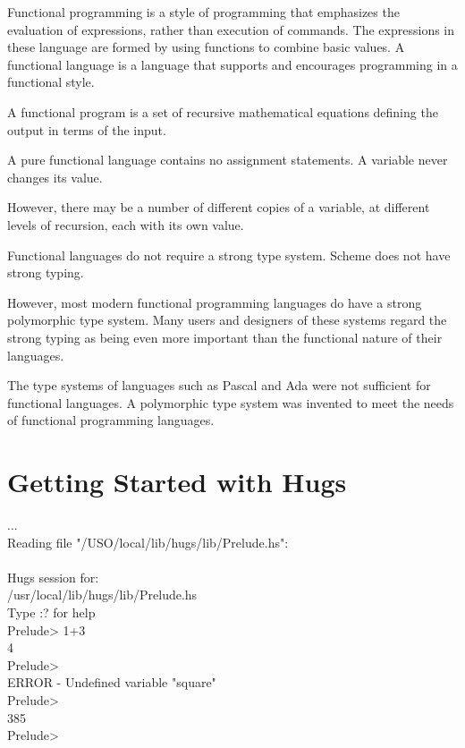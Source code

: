 \documentclass{seminar}
\begin{document}
\begin{slide}
{Functional programming is a style of programming that emphasizes
the evaluation of expressions, rather than execution of commands.
The expressions in these language are formed by using functions to
combine basic values.  A functional language is a language that
supports and encourages programming in a functional style.
}

\newslide

A functional program is a set of recursive mathematical equations
defining the output in terms of the input.

A pure functional language contains no assignment statements.  A
variable never changes its value.

However, there may be a number of different copies of a variable,
at different levels of recursion, each with its own value.

\newslide

Functional languages do not require a strong type system.  Scheme does not
have strong typing.

However, most modern functional programming languages do have a strong
polymorphic type system.  Many users and designers of these systems
regard the strong typing as being even more important than the functional
nature of their languages.

The type systems of languages such as Pascal and Ada were not sufficient
for functional languages.  A polymorphic type system was invented to
meet the needs of functional programming languages.

\newslide

\section*{Getting Started with Hugs}

\begin{code}%
\color{red}
{\LARGE ...}\\
Reading file "/USO/local/lib/hugs/lib/Prelude.hs":\\
                   \\
Hugs session for:\\
/usr/local/lib/hugs/lib/Prelude.hs\\
Type :? for help\\
Prelude> \color{CodeColor}1+3\\
4\\
Prelude>\\
ERROR - Undefined variable "square"\\
Prelude>\\
385\\
Prelude>
\end{code}


\end{slide}
\end{document}
